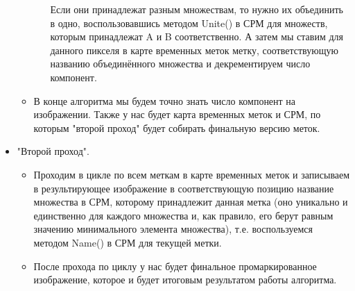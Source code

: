 \documentclass{report}
\begin{document}
\begin{itemize}
\begin{itemize}
\begin{enumerate}
					\par Если они принадлежат разным множествам, то нужно их объединить в одно, воспользовавшись методом Unite() в СРМ для множеств, которым принадлежат A и B соответственно. А затем мы ставим для данного пикселя в карте временных меток метку, соответствующую названию объединённого множества и декрементируем число компонент.
				\end{enumerate}
				\item В конце алгоритма мы будем точно знать число компонент на изображении. Также у нас будет карта временных меток и СРМ, по которым "второй проход"{} будет собирать финальную версию меток.
			\end{itemize}
			\item "Второй проход"{}.
			\begin{itemize}
				\item Проходим в цикле по всем меткам в карте временных меток и записываем в результирующее изображение в соответствующую позицию название множества в СРМ, которому принадлежит данная метка (оно уникально и единственно для каждого множества и, как правило, его берут равным значению минимального элемента множества), т.е. воспользуемся методом Name() в СРМ для текущей метки.
				\item После прохода по циклу у нас будет финальное промаркированное изображение, которое и будет итоговым результатом работы алгоритма.
			\end{itemize}
		\end{itemize}
	\newpage


\end{document}
